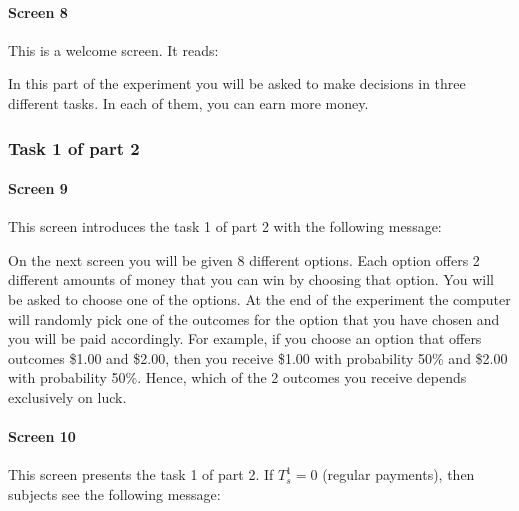 \documentclass[11pt]{article}
\begin{document}
\paragraph{Screen 8} This is a welcome screen. It reads:

\begin{tcolorbox}
  In this part of the experiment you will be asked to make decisions in three different tasks. In each of them, you can earn more money.
\end{tcolorbox}

\subsubsection{Task 1 of part 2}

\paragraph{Screen 9} This screen introduces the task 1 of part 2 with the following message:

\begin{tcolorbox}
On the next screen you will be given 8 different options. Each option offers 2 different amounts of money that you can win by choosing that option. You will be asked to choose one of the options. At the end of the experiment the computer will randomly pick one of the outcomes for the option that you have chosen and you will be paid accordingly. For example, if you choose an option that offers outcomes \$1.00 and \$2.00, then you receive \$1.00 with probability 50\% and \$2.00 with probability 50\%.  Hence, which of the 2 outcomes you receive depends exclusively on luck.
\end{tcolorbox}

\paragraph{Screen 10} This screen presents the task 1 of part 2. If $T_s^1=0$ (regular payments), then subjects see the following message:
\end{document}
